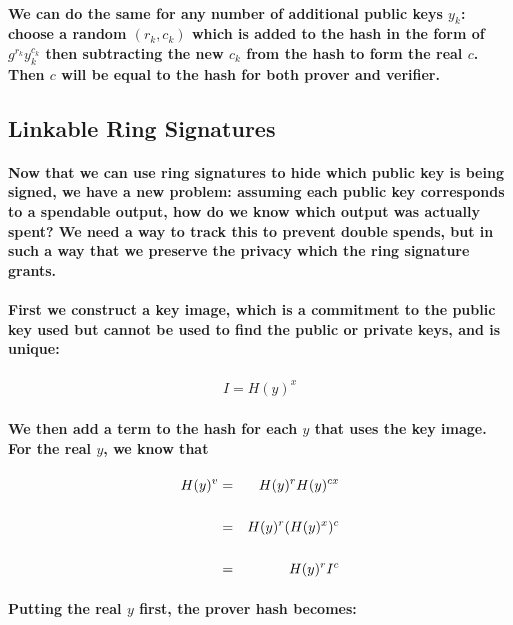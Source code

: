 \documentclass{article}
\begin{document}
\paragraph{We can do the same for any number of additional public keys $y_k$: choose a random $(r_k,c_k)$ which is added to the hash in the form of $g^{r_k}y_k^{c_k}$ then subtracting the new $c_k$ from the hash to form the real $c$. Then $c$ will be equal to the hash for both prover and verifier.}



\subsection{Linkable Ring Signatures}

\paragraph{Now that we can use ring signatures to hide which public key is being signed, we have a new problem: assuming each public key corresponds to a spendable output, how do we know which output was actually spent?  We need a way to track this to prevent double spends, but in such a way that we preserve the privacy which the ring signature grants.}

\paragraph{First we construct a key image, which is a commitment to the public key used but cannot be used to find the public or private keys, and is unique:}

\begin{eqnarray}
  I = H(y)^x
\end{eqnarray}

\paragraph{We then add a term to the hash for each $y$ that uses the key image.  For the real $y$, we know that}

\begin{eqnarray}
  H(y)^v &=& H(y)^r H(y)^{cx}\\
  \cr &=& H(y)^r (H(y)^x)^c\\
  \cr &=& H(y)^r I^c
\end{eqnarray}

\paragraph{Putting the real $y$ first, the prover hash becomes:}
\end{document}
